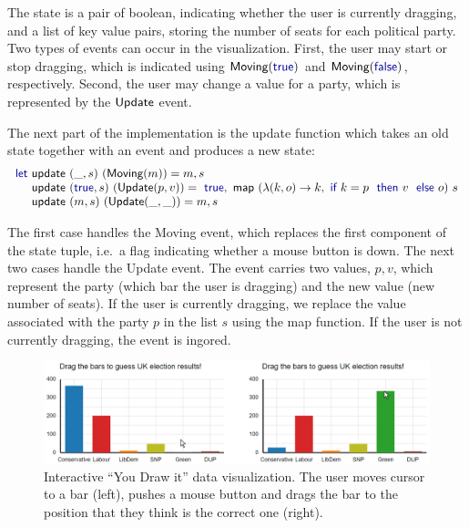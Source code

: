 \documentclass{jfp}
\newcommand{\ident}[1]{\textnormal{\textcolor{idclr}{\sffamily #1}}}
\newcommand{\fkvd}[1]{\textnormal{\textcolor{fkvdclr}{\sffamily #1}}}
\begin{document}
\vspace{-0.5em}
\noindent
The state is a pair of boolean, indicating whether the user is currently dragging, and
a list of key value pairs, storing the number of seats for each political party. Two types of events
can occur in the visualization. First, the user may start or stop dragging, which is indicated using
$\ident{Moving}(\fkvd{true})$ and $\ident{Moving}(\fkvd{false})$, respectively. Second, the user
may change a value for a party, which is represented by the $\ident{Update}$ event.

The next part of the implementation is the \ident{update} function which takes an old state together
with an event and produces a new state:
%
\begin{equation*}
\begin{array}{l}
\fkvd{let}~\ident{update}~(\_,s)~(\ident{Moving}(m)) = m,s\\
\hspace{1.05em}~\ident{update}~(\fkvd{true},s)~(\ident{Update}(p, v)) =
  \fkvd{true}, \ident{map}~(\lambda(k, o) \rightarrow k, \fkvd{if}~k = p~\fkvd{then}~v~\fkvd{else}~o)~s\\
\hspace{1.05em}~\ident{update}~(m,s)~(\ident{Update}(\_, \_)) = m,s\\
\end{array}
\end{equation*}

\vspace{-0.5em}
\noindent
The first case handles the \ident{Moving} event, which replaces the first component of the
state tuple, i.e.~a flag indicating whether a mouse button is down.
The next two cases handle the \ident{Update} event. The event carries two values, $p, v$, which
represent the party (which bar the user is dragging) and the new value (new number of seats).
If the user is currently dragging, we replace the value associated with the party $p$ in \noindent the
list $s$ using the \ident{map} function. If the user is not currently dragging, the event is ingored.

\begin{figure}[t]
  \includegraphics[scale=0.57]{figures/youdraw}
  \vspace{1em}
  \caption{Interactive ``You Draw it'' data visualization. The user moves cursor to a bar (left),
    pushes a mouse button and drags the bar to the position that they think is the correct one (right).}
  \label{fig:youdraw}
\end{figure}
\end{document}
